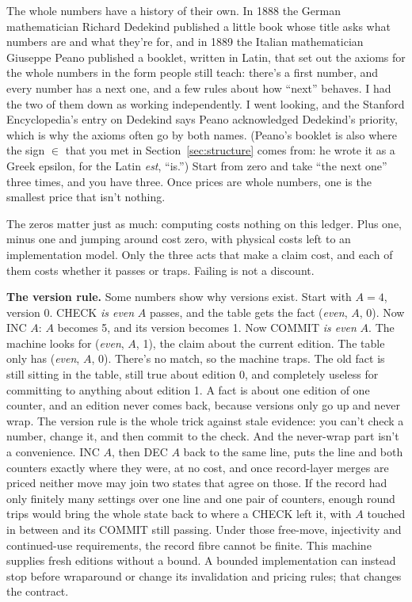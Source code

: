 \documentclass[11pt,twoside]{article}
\theoremstyle{thielethm}
\theoremstyle{thieledef}
\theoremstyle{thieledef}
\theoremstyle{thieledef}
\theoremstyle{thielethm}
\theoremstyle{thieleobs}
\theoremstyle{thielethm}
\begin{document}
The whole numbers have a history of their own. In 1888 the German
mathematician Richard
Dedekind published a little book whose title asks what numbers are and what they're for, and in
1889 the Italian mathematician Giuseppe Peano published a booklet, written in Latin, that set out
the axioms for the whole numbers in the form people still teach: there's a first number,
and every number has a next one, and a few rules about how ``next'' behaves. I had the two of
them down as working independently. I went looking, and the Stanford Encyclopedia's entry on
Dedekind says Peano acknowledged Dedekind's priority, which is why the axioms often go by both
names. (Peano's booklet is also where the
sign $\in$ that you met in Section~\ref{sec:structure} comes from: he wrote it as a Greek epsilon,
for the Latin \emph{est}, ``is.'') Start from zero and take ``the next one'' three times, and you have three.
Once prices are whole numbers, one is the smallest price that isn't nothing.

The zeros matter just as much:
computing costs nothing on this ledger. Plus one, minus one and jumping around cost zero,
with physical costs left to an implementation model.
Only the three acts that make a claim cost, and each of them costs whether it passes or traps. Failing is not a discount.

\textbf{The version rule.} Some numbers show why versions exist. Start with $A = 4$, version 0.
CHECK \emph{is even} $A$ passes, and the table gets the fact (\emph{even}, $A$, 0). Now INC $A$: $A$
becomes 5, and its version becomes 1. Now COMMIT \emph{is even} $A$. The machine looks for
(\emph{even}, $A$, 1), the claim about the current edition. The table only has (\emph{even}, $A$, 0).
There's no match, so the machine traps. The old fact is still sitting in the table, still true about edition 0,
and completely useless for committing to anything about edition 1. A fact is about one
edition of one counter, and an edition never comes back, because versions only go up and
never wrap. The version rule is the whole trick against stale evidence: you can't check a number, change it, and then commit to the check. And the never-wrap part isn't a convenience. INC $A$, then DEC $A$ back to the same line, puts the line and both counters exactly where they were, at no cost, and once record-layer merges are priced neither move may join two states that agree on those. If the record had only finitely many settings over one line and one pair of counters, enough round trips would bring the whole state back to where a CHECK left it, with $A$ touched in between and its COMMIT still passing. Under those free-move, injectivity and continued-use requirements, the
record fibre cannot be finite. This machine supplies fresh editions without
a bound. A bounded implementation can instead stop before wraparound or
change its invalidation and pricing rules; that changes the contract.
\end{document}
